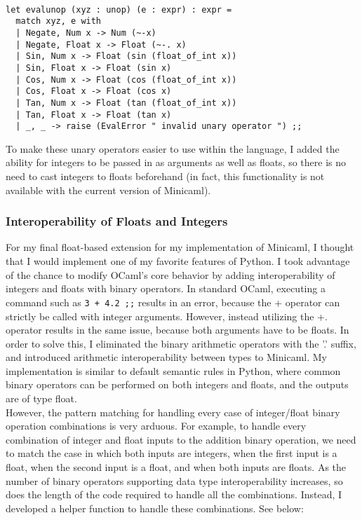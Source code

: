 \documentclass{article}
\begin{document}
\begin{verbatim}

let evalunop (xyz : unop) (e : expr) : expr = 
  match xyz, e with 
  | Negate, Num x -> Num (~-x)
  | Negate, Float x -> Float (~-. x)
  | Sin, Num x -> Float (sin (float_of_int x))
  | Sin, Float x -> Float (sin x)
  | Cos, Num x -> Float (cos (float_of_int x))
  | Cos, Float x -> Float (cos x)
  | Tan, Num x -> Float (tan (float_of_int x))
  | Tan, Float x -> Float (tan x)
  | _, _ -> raise (EvalError " invalid unary operator ") ;;
\end{verbatim}

To make these unary operators easier to use within the language, I added the ability for integers to be passed in as arguments as well as floats, so there is no need to cast integers to floats beforehand (in fact, this functionality is not available with the current version of Minicaml). 

\subsubsection{Interoperability of Floats and Integers}

For my final float-based extension for my implementation of Minicaml, I thought that I would implement one of my favorite features of Python. I took advantage of the chance to modify OCaml's core behavior by adding interoperability of integers and floats with binary operators. In standard OCaml, executing a command such as \texttt{3 + 4.2 ;;} results in an error, because the + operator can strictly be called with integer arguments. However, instead utilizing the +. operator results in the same issue, because both arguments have to be floats. In order to solve this, I eliminated the binary arithmetic operators with the '.' suffix, and introduced arithmetic interoperability between types to Minicaml. My implementation is similar to default semantic rules in Python, where common binary operators can be performed on both integers and floats, and the outputs are of type float. \\

However, the pattern matching for handling every case of integer/float binary operation combinations is very arduous. For example, to handle every combination of integer and float inputs to the addition binary operation, we need to match the case in which both inputs are integers, when the first input is a float, when the second input is a float, and when both inputs are floats. As the number of binary operators supporting data type interoperability increases, so does the length of the code required to handle all the combinations. Instead, I developed a helper function to handle these combinations. See below:
\end{document}
